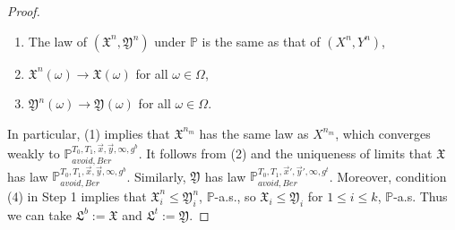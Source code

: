 \begin{proof}
\begin{enumerate}[label=(\arabic*)]
		\item The law of $(\mathfrak{X}^n,\mathfrak{Y}^n)$ under $\mathbb{P}$ is the same as that of $(X^n,Y^n)$,
		
		\item $\mathfrak{X}^n(\omega) \longrightarrow \mathfrak{X}(\omega)$ for all $\omega\in\Omega$,
		
		\item $\mathfrak{Y}^n(\omega) \longrightarrow \mathfrak{Y}(\omega)$ for all $\omega\in\Omega$.
		
	\end{enumerate}
	
	In particular, (1) implies that $\mathfrak{X}^{n_m}$ has the same law as $X^{n_m}$, which converges weakly to $\mathbb{P}_{avoid,Ber}^{T_0,T_1,\vec{x},\vec{y},\infty,g^b}$. It follows from (2) and the uniqueness of limits that $\mathfrak{X}$ has law $\mathbb{P}_{avoid,Ber}^{T_0,T_1,\vec{x},\vec{y},\infty,g^b}$. Similarly, $\mathfrak{Y}$ has law $\mathbb{P}_{avoid,Ber}^{T_0,T_1,\vec{x}',\vec{y}',\infty,g^t}$. Moreover, condition (4) in Step 1 implies that $\mathfrak{X}^n_i \leq \mathfrak{Y}^n_i$, $\mathbb{P}$-a.s., so $\mathfrak{X}_i \leq \mathfrak{Y}_i$ for $1\leq i\leq k$, $\mathbb{P}$-a.s. Thus we can take $\mathfrak{L}^b := \mathfrak{X}$ and $\mathfrak{L}^t := \mathfrak{Y}$.
	
\end{proof}
